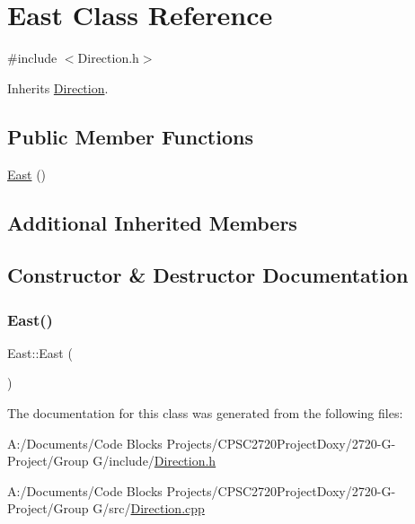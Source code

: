 \hypertarget{class_east}{}\section{East Class Reference}
\label{class_east}


{\ttfamily \#include $<$Direction.\+h$>$}



Inherits \mbox{\hyperlink{class_direction}{Direction}}.

\subsection*{Public Member Functions}
\begin{DoxyCompactItemize}
\item 
\mbox{\hyperlink{class_east_ac0f0d09a64a1f0fe924637da6814833b}{East}} ()
\end{DoxyCompactItemize}
\subsection*{Additional Inherited Members}


\subsection{Constructor \& Destructor Documentation}
\mbox{\label{class_east_ac0f0d09a64a1f0fe924637da6814833b}} 
\subsubsection{\texorpdfstring{East()}{East()}}
{\footnotesize\ttfamily East\+::\+East (\begin{DoxyParamCaption}{ }\end{DoxyParamCaption})}



The documentation for this class was generated from the following files\+:\begin{DoxyCompactItemize}
\item 
A\+:/\+Documents/\+Code Blocks Projects/\+C\+P\+S\+C2720\+Project\+Doxy/2720-\/\+G-\/\+Project/\+Group G/include/\mbox{\hyperlink{_direction_8h}{Direction.\+h}}\item 
A\+:/\+Documents/\+Code Blocks Projects/\+C\+P\+S\+C2720\+Project\+Doxy/2720-\/\+G-\/\+Project/\+Group G/src/\mbox{\hyperlink{_direction_8cpp}{Direction.\+cpp}}\end{DoxyCompactItemize}

